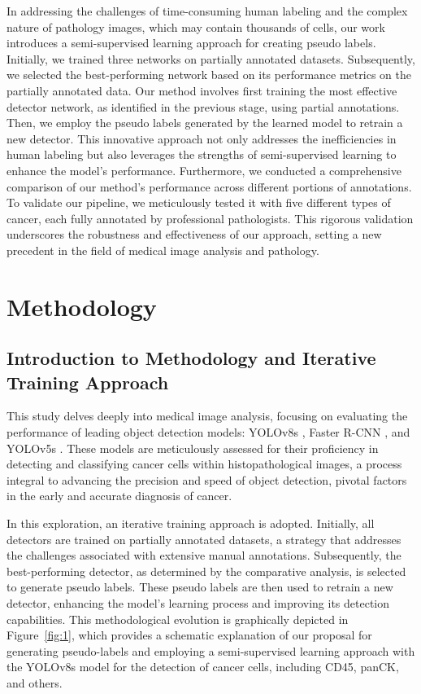 \documentclass[anon]{midl} %
\begin{document}
In addressing the challenges of time-consuming human labeling and the complex nature of pathology images, which may contain thousands of cells, our work introduces a semi-supervised learning approach for creating pseudo labels. Initially, we trained three networks on partially annotated datasets. Subsequently, we selected the best-performing network based on its performance metrics on the partially annotated data. Our method involves first training the most effective detector network, as identified in the previous stage, using partial annotations. Then, we employ the pseudo labels generated by the learned model to retrain a new detector. This innovative approach not only addresses the inefficiencies in human labeling but also leverages the strengths of semi-supervised learning to enhance the model's performance. Furthermore, we conducted a comprehensive comparison of our method's performance across different portions of annotations. To validate our pipeline, we meticulously tested it with five different types of cancer, each fully annotated by professional pathologists. This rigorous validation underscores the robustness and effectiveness of our approach, setting a new precedent in the field of medical image analysis and pathology.

\section{Methodology}
\label{sec:methodology}

\subsection{Introduction to Methodology and Iterative Training Approach}
This study delves deeply into medical image analysis, focusing on evaluating the performance of leading object detection models: YOLOv8s \cite{ultralytics2023}, Faster R-CNN \cite{ren2015faster}, and YOLOv5s \cite{yolov5}. These models are meticulously assessed for their proficiency in detecting and classifying cancer cells within histopathological images, a process integral to advancing the precision and speed of object detection, pivotal factors in the early and accurate diagnosis of cancer.

In this exploration, an iterative training approach is adopted. Initially, all detectors are trained on partially annotated datasets, a strategy that addresses the challenges associated with extensive manual annotations. Subsequently, the best-performing detector, as determined by the comparative analysis, is selected to generate pseudo labels. These pseudo labels are then used to retrain a new detector, enhancing the model's learning process and improving its detection capabilities. This methodological evolution is graphically depicted in Figure~\ref{fig:1}, which provides a schematic explanation of our proposal for generating pseudo-labels and employing a semi-supervised learning approach with the YOLOv8s model for the detection of cancer cells, including CD45, panCK, and others.
\end{document}
